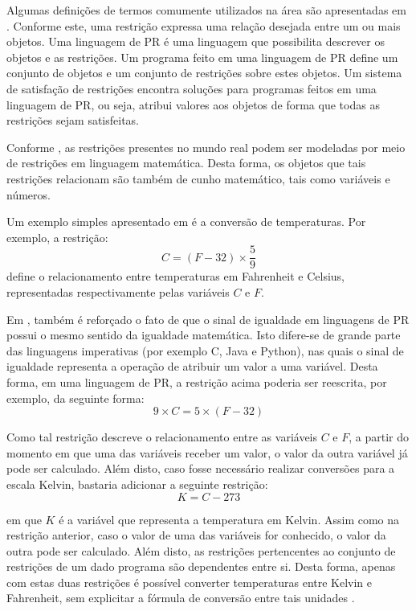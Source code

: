 Algumas definições de termos comumente utilizados na área são apresentadas em \cite{leler}. Conforme este, uma restrição expressa uma relação desejada entre um ou mais objetos. Uma linguagem de PR é uma linguagem que possibilita descrever os objetos e as restrições. Um programa feito em uma linguagem de PR define um conjunto de objetos e um conjunto de restrições sobre estes objetos. Um sistema de satisfação de restrições encontra soluções para programas feitos em uma linguagem de PR, ou seja, atribui valores aos objetos de forma que todas as restrições sejam satisfeitas.

Conforme \cite{stuckey}, as restrições presentes no mundo real podem ser modeladas por meio de restrições em linguagem matemática. Desta forma, os objetos que tais restrições relacionam são também de cunho matemático, tais como variáveis e números.

Um exemplo simples apresentado em \cite{leler} é a conversão de temperaturas. Por exemplo, a restrição:
\[
  C = (F - 32) \times \frac{5}{9}
\]
define o relacionamento entre temperaturas em Fahrenheit e Celsius, representadas respectivamente pelas variáveis $C$ e $F$.

Em \cite{leler}, também é reforçado o fato de que o sinal de igualdade em linguagens de PR possui o mesmo sentido da igualdade matemática. Isto difere-se de grande parte das linguagens imperativas (por exemplo C, Java e Python), nas quais o sinal de igualdade representa a operação de atribuir um valor a uma variável. Desta forma, em uma linguagem de PR, a restrição acima poderia ser reescrita, por exemplo, da seguinte forma:
\[
  9 \times C = 5 \times (F - 32)
\]

Como tal restrição descreve o relacionamento entre as variáveis $C$ e $F$, a partir do momento em que uma das variáveis receber um valor, o valor da outra variável já pode ser calculado. Além disto, caso fosse necessário realizar conversões para a escala Kelvin, bastaria adicionar a seguinte restrição:
\[
  K = C - 273
\]

em que $K$ é a variável que representa a temperatura em Kelvin. Assim como na restrição anterior, caso o valor de uma das variáveis for conhecido, o valor da outra pode ser calculado. Além disto, as restrições pertencentes ao conjunto de restrições de um dado programa são dependentes entre si. Desta forma, apenas com estas duas restrições é possível converter temperaturas entre Kelvin e Fahrenheit, sem explicitar a fórmula de conversão entre tais unidades \cite{leler}.

